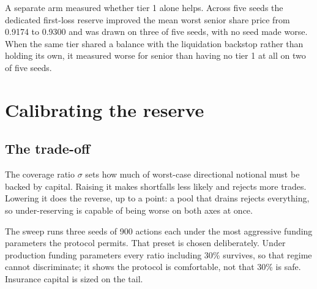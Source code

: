 \documentclass[11pt,a4paper]{article}
\begin{document}
A separate arm measured whether tier 1 alone helps. Across five seeds the dedicated
first-loss reserve improved the mean worst senior share price from 0.9174 to 0.9300 and was
drawn on three of five seeds, with no seed made worse. When the same tier shared a balance
with the liquidation backstop rather than holding its own, it measured worse for senior than
having no tier 1 at all on two of five seeds.

\section{Calibrating the reserve}
\label{sec:calibration}

\subsection{The trade-off}

The coverage ratio $\sigma$ sets how much of worst-case directional notional must be backed
by capital. Raising it makes shortfalls less likely and rejects more trades. Lowering it does
the reverse, up to a point: a pool that drains rejects everything, so under-reserving is
capable of being worse on both axes at once.

The sweep runs three seeds of 900 actions each under the most aggressive funding parameters
the protocol permits. That preset is chosen deliberately. Under production funding parameters
every ratio including 30\% survives, so that regime cannot discriminate; it shows the protocol
is comfortable, not that 30\% is safe. Insurance capital is sized on the tail.
\end{document}
